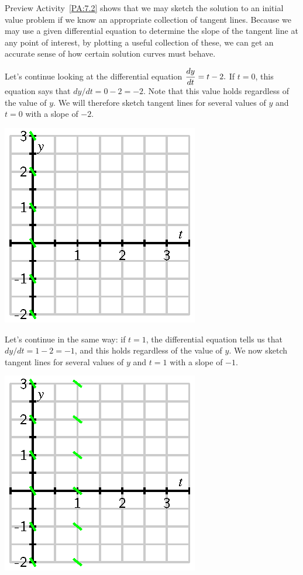 Preview Activity~\ref{PA:7.2} shows that we may sketch the solution to an initial
value problem if we know an appropriate collection of tangent lines.  Because we may use a given differential equation to determine the slope of the tangent
line at any point of interest, by plotting a useful collection of these, we can get an accurate sense of how certain solution curves must behave.

Let's continue looking at the differential equation $
\displaystyle \frac{dy}{dt} = t-2.
$
If $t=0$, this equation says that $dy/dt = 0-2=-2$.  Note that this value holds regardless of the value of $y$.  We will therefore
sketch tangent lines for several values of $y$ and $t=0$ with a slope
of $-2$. 

\begin{center}
  \includegraphics{figures/7_2_field_0.eps}
\end{center}

Let's continue in the same way:  if $t=1$, the differential equation
tells us that $dy/dt = 1-2=-1$, and this holds regardless of the value of $y$.  We now sketch tangent lines for
several values of $y$ and $t=1$ with a slope of $-1$.

\begin{center}
  \includegraphics{figures/7_2_field_1.eps}
\end{center}

